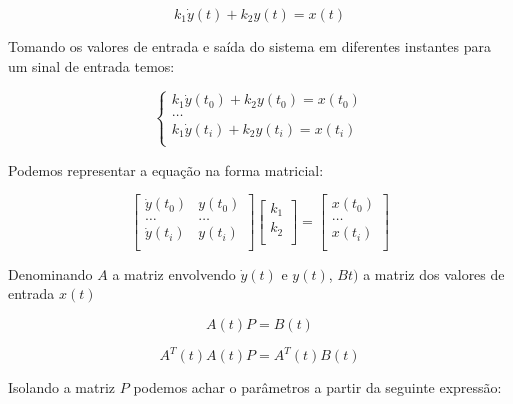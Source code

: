 \documentclass[a4paper,11pt]{article}
\begin{document}
\begin{equation}
k_1 \dot{y}(t) + k_2 y(t) = x(t)
\end{equation}

Tomando os valores de entrada e saída do sistema em diferentes instantes para um sinal de entrada temos:

\begin{equation}
\left\{\begin{array}{c}
    k_1 \dot{y}(t_0) + k_2 y(t_0) = x(t_0)  \\
    \dots\\
    k_1 \dot{y}(t_i) + k_2 y(t_i) = x(t_i)  \\
\end{array} \right.
\end{equation}


Podemos representar a equação na forma matricial:

\begin{equation}
\left[\begin{array}{cc}
    \dot{y}(t_0) & y(t_0)\\
    \dots  & \dots \\
    \dot{y}(t_i) & y(t_i)\\
\end{array} \right]
\left[\begin{array}{c}
    k_1\\
    k_2\\
\end{array} \right]
=
\left[\begin{array}{c}
    x(t_0)  \\
    \dots\\
    x(t_i)  \\
\end{array} \right]
\end{equation}


Denominando $A$ a matriz envolvendo $\dot{y}(t)$ e $y(t)$, $Bt)$ a matriz dos valores de entrada $x(t)$

\begin{equation}
    A(t) P = B(t)
\end{equation}

\begin{equation}
    A^T(t)A(t) P = A^T(t) B(t)
\end{equation}

Isolando a matriz $P$ podemos achar o parâmetros a partir da seguinte expressão:
\end{document}
